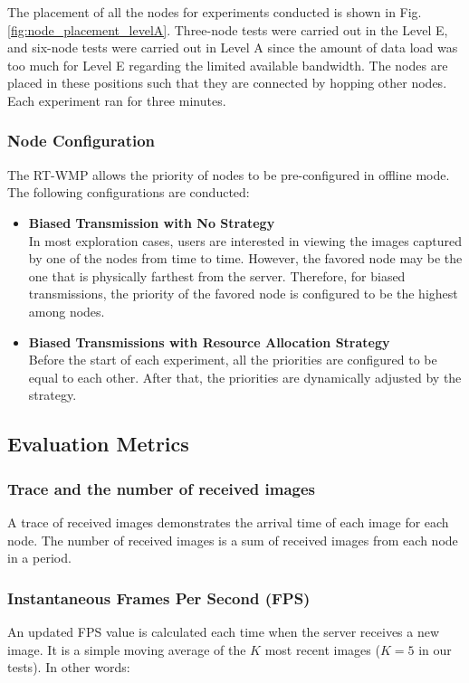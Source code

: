 \documentclass[journal]{IEEEtran}  %
\begin{document}
The placement of all the nodes for experiments conducted is shown in
  Fig. \ref{fig:node_placement_levelA}.
Three-node tests were carried out in the Level E, and six-node tests 
were carried out in Level A since the amount of data load was too much 
for Level E regarding the limited available bandwidth.
The nodes are placed in these positions such that they are connected by hopping
other nodes. Each experiment ran for three minutes.

\subsubsection{Node Configuration}
The RT-WMP allows the priority of nodes to be pre-configured in offline mode.
The following configurations are conducted:
\begin{itemize}
\item \textbf{Biased Transmission with No Strategy}  \\
    In most exploration cases, users are interested in viewing the images
    captured by one of the nodes from time to time. 
    However, the favored node may be the one that is physically farthest from the server. 
Therefore, for biased transmissions, the priority of the
favored node is configured to be the highest among nodes.
\item \textbf{Biased Transmissions with Resource Allocation Strategy}\\
    Before the start of each experiment, all the priorities are configured to
    be equal to each other. After that, the priorities are dynamically adjusted
    by the strategy.
\end{itemize}

\subsection{Evaluation Metrics}
\subsubsection{Trace and the number of received images}
A trace of received images demonstrates the arrival time of each image for each
  node. The number of received images is a sum of received images from
  each node in a period.
\subsubsection{Instantaneous Frames Per Second (FPS)}
An updated FPS value is calculated each time when the server receives 
a new image. It is a simple moving average of the $K$ most recent images ($K=5$
      in our tests). In other words:
\end{document}
